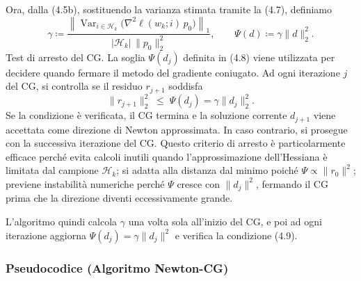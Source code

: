 \documentclass[a4paper,12pt]{article}
\begin{document}
Ora, dalla (4.5b), sostituendo la varianza stimata tramite la (4.7), definiamo
\[
\gamma \coloneqq
\frac{\left\| \operatorname{Var}_{i\in\mathcal{H}_k}\bigl(\nabla^2\ell(w_k;i)\,p_0\bigr) \right\|_1}{|\mathcal{H}_k| \, \|p_0\|_2^2},
\qquad
\Psi(d) \coloneqq \gamma \|d\|_2^2.
\tag{4.8}
\]
\medskip
\noindent
Test di arresto del CG.
La soglia $\Psi(d_j)$ definita in (4.8) viene utilizzata per decidere quando fermare il metodo del gradiente coniugato. Ad ogni iterazione $j$ del CG, si controlla se il residuo $r_{j+1}$ soddisfa
\[
\| r_{j+1} \|_2^2 \;\le\; \Psi(d_j) = \gamma \|d_j\|_2^2.
\tag{4.9}
\]
Se la condizione è verificata, il CG termina e la soluzione corrente $d_{j+1}$ viene accettata come direzione di Newton approssimata. In caso contrario, si prosegue con la successiva iterazione del CG.
Questo criterio di arresto è particolarmente efficace perché evita calcoli inutili quando l'approssimazione dell'Hessiana è limitata dal campione $\mathcal{H}_k$; si adatta alla distanza dal minimo poiché $\Psi \propto \|r_0\|^2$; previene instabilità numeriche perché $\Psi$ cresce con $\|d_j\|^2$, fermando il CG prima che la direzione diventi eccessivamente grande.

L'algoritmo quindi calcola $\gamma$ una volta sola all'inizio del CG, e poi ad ogni iterazione aggiorna $\Psi(d_j) = \gamma \|d_j\|^2$ e verifica la condizione (4.9).
\medskip
\noindent
\newpage
\subsubsection{Pseudocodice (Algoritmo Newton-CG)}
\end{document}
